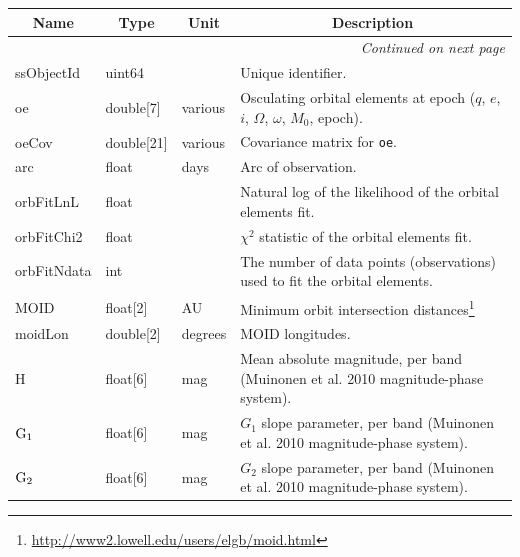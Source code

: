 \begin{center}
\label{tab:SSObj}
\begin{longtable}{p{3cm}p{2cm}p{2cm}p{5cm}}

\hline \multicolumn{1}{c}{\bf Name} & \multicolumn{1}{c}{\bf Type} & \multicolumn{1}{c}{\bf Unit} & \multicolumn{1}{c}{\bf Description} \\ \hline
\endhead

\hline \multicolumn{4}{r}{{\em Continued on next page}} \\
\endfoot

\hline\hline
\endlastfoot

ssObjectId & uint64 & ~ & Unique identifier. \\ 

oe & double[7] & various & Osculating orbital elements at epoch ($q$, $e$, $i$, $\Omega$, $\omega$, $M_0$, epoch). \\

oeCov & double[21] & various & Covariance matrix for \texttt{oe}. \\

arc & float & days & Arc of observation. \\

orbFitLnL & float & ~ & Natural log of the likelihood of the orbital elements fit. \\

orbFitChi2 & float & ~ & $\chi^2$ statistic of the orbital elements fit. \\

orbFitNdata & int & ~ & The number of data points (observations) used to fit the orbital elements. \\

MOID & float[2] & AU & Minimum orbit intersection distances\footnote{\url{http://www2.lowell.edu/users/elgb/moid.html}} \\

moidLon & double[2] & degrees & MOID longitudes. \\

H & float[6] & mag & Mean absolute magnitude, per band (Muinonen et al. 2010 magnitude-phase system). \\

${\rm G_1}$ & float[6] & mag & $G_1$ slope parameter, per band (Muinonen et al. 2010 magnitude-phase system). \\

${\rm G_2}$ & float[6] & mag & $G_2$ slope parameter, per band (Muinonen et al. 2010 magnitude-phase system). \\


\end{longtable}
\end{center}
